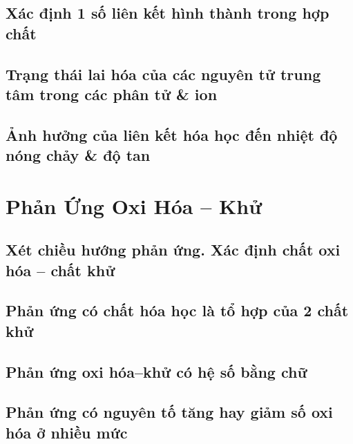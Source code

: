 \documentclass{article}
\numberwithin{equation}{section}
\begin{document}
\subsection{Xác định 1 số liên kết hình thành trong hợp chất}


\subsection{Trạng thái lai hóa của các nguyên tử trung tâm trong các phân tử \& ion}


\subsection{Ảnh hưởng của liên kết hóa học đến nhiệt độ nóng chảy \& độ tan}


\section{Phản Ứng Oxi Hóa -- Khử}

\subsection{Xét chiều hướng phản ứng. Xác định chất oxi hóa -- chất khử}


\subsection{Phản ứng có chất hóa học là tổ hợp của 2 chất khử}


\subsection{Phản ứng oxi hóa--khử có hệ số bằng chữ}


\subsection{Phản ứng có nguyên tố tăng hay giảm số oxi hóa ở nhiều mức}
\end{document}
